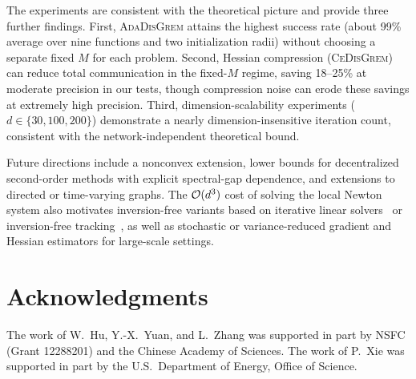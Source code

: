 \documentclass[review,onefignum,onetabnum]{siamart171218}
\begin{document}
	The experiments are consistent with the theoretical picture and provide
	three further findings. First, \textsc{AdaDisGrem} attains the highest success rate
	(about 99\% average over nine functions and two initialization radii)
	without choosing a separate fixed $M$ for each problem. Second, Hessian compression
	(\textsc{CeDisGrem}) can reduce
	total communication in the fixed-$M$ regime, saving 18--25\% at
	moderate precision in our tests, though compression noise can erode
	these savings at extremely high precision. Third, dimension-scalability
	experiments ($d\in\{30,100,200\}$) demonstrate a nearly dimension-insensitive
	iteration count, consistent with the network-independent theoretical bound.
	
	Future directions include a nonconvex extension, lower bounds for
	decentralized second-order methods with explicit spectral-gap dependence,
	and extensions to directed or time-varying graphs.
	The $\mathcal{O}(d^3)$ cost of solving the local Newton system also motivates
	inversion-free variants based on iterative linear solvers~\citep{jakovetic2025dinas}
	or inversion-free tracking~\citep{yuan2023indo}, as well as stochastic
	or variance-reduced gradient and Hessian estimators for large-scale settings.
	
	
	\section*{Acknowledgments}
	The work of W.~Hu, Y.-X.~Yuan, and L.~Zhang was supported in part by NSFC (Grant 12288201) and the Chinese Academy of Sciences.
	The work of P.~Xie was supported in part by the U.S.\ Department of Energy, Office of Science.
	
\end{document}
